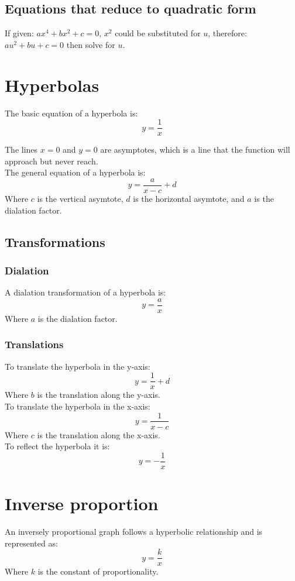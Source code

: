 \documentclass[a4paper,10pt]{report}
\begin{document}
\subsection{Equations that reduce to quadratic form}
If given: $ax^4 + bx^2 + c = 0$, $x^2$ could be substituted for $u$, therefore: $au^2 + bu + c = 0$ then solve for $u$.

\section{Hyperbolas}
The basic equation of a hyperbola is:
$$
	y = \frac{1}{x}
$$

The lines $x = 0$ and $y = 0$ are asymptotes, which is a line that the function will approach but never reach.\\

The general equation of a hyperbola is:
$$
	y = \frac{a}{x - c} + d
$$
Where $c$ is the vertical asymtote, $d$ is the horizontal asymtote, and $a$ is the dialation factor.

\subsection{Transformations}
\subsubsection{Dialation}
A dialation transformation of a hyperbola is:
$$
	y = \frac{a}{x}
$$
Where $a$ is the dialation factor.

\subsubsection{Translations}
To translate the hyperbola in the y-axis:
$$
	y = \frac{1}{x} + d
$$
Where $b$ is the translation along the y-axis.\\

To translate the hyperbola in the x-axis:
$$
	y = \frac{1}{x - c}
$$
Where $c$ is the translation along the x-axis.\\

To reflect the hyperbola it is:
$$
	y = -\frac{1}{x}
$$

\section{Inverse proportion}
An inversely proportional graph follows a hyperbolic relationship and is represented as:
$$
	y = \frac{k}{x}
$$
Where $k$ is the constant of proportionality.
\end{document}
